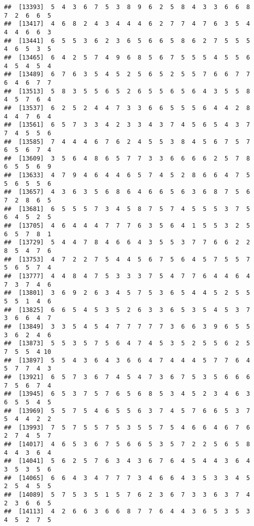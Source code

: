 \documentclass[
]{book}
\begin{document}
\begin{verbatim}
##  [13393]  5  4  3  6  7  5  3  8  9  6  2  5  8  4  3  3  6  6  8  7  2  6  6  5
##  [13417]  4  6  8  2  4  3  4  4  4  6  2  7  7  4  7  6  3  5  4  4  4  6  6  3
##  [13441]  6  5  5  3  6  2  3  6  5  6  6  5  8  6  2  7  5  5  5  4  6  5  3  5
##  [13465]  6  4  2  5  7  4  9  6  8  5  6  7  5  5  5  4  5  5  6  4  5  4  5  4
##  [13489]  6  7  6  3  5  4  5  2  5  6  5  2  5  5  7  6  6  7  7  6  4  6  7  7
##  [13513]  5  8  3  5  5  6  5  2  6  5  5  6  5  6  4  3  5  5  8  4  5  7  6  4
##  [13537]  6  2  5  2  4  4  7  3  3  6  6  5  5  5  6  4  4  2  8  4  4  7  6  4
##  [13561]  6  5  7  3  3  4  2  3  3  4  3  7  4  5  6  5  4  3  7  7  4  5  5  6
##  [13585]  7  4  4  4  6  7  6  2  4  5  5  3  8  4  5  6  7  5  7  6  5  6  7  4
##  [13609]  3  5  6  4  8  6  5  7  7  3  3  6  6  6  6  2  5  7  8  6  5  5  6  9
##  [13633]  4  7  9  4  6  4  4  6  5  7  4  5  2  8  6  6  4  7  5  5  6  5  5  6
##  [13657]  4  3  6  3  5  6  8  6  4  6  6  5  6  3  6  8  7  5  6  7  2  8  6  5
##  [13681]  6  5  5  5  7  3  4  5  8  7  5  7  4  5  5  5  3  7  5  6  4  5  2  5
##  [13705]  4  6  4  4  4  7  7  7  6  3  5  6  4  1  5  5  3  2  5  6  5  7  8  1
##  [13729]  5  4  4  7  8  4  6  6  4  3  5  5  3  7  7  6  6  2  2  8  5  4  7  6
##  [13753]  4  7  2  2  7  5  4  4  5  6  7  5  6  4  5  7  5  5  7  5  6  5  7  4
##  [13777]  4  4  8  4  7  5  3  3  3  7  5  4  7  7  6  4  4  6  4  7  3  7  4  6
##  [13801]  3  6  9  2  6  3  4  5  7  5  3  6  5  4  4  5  2  5  5  5  5  1  4  6
##  [13825]  6  6  5  4  5  3  5  2  6  3  3  6  5  3  5  4  5  3  7  3  6  6  4  7
##  [13849]  3  3  5  4  5  4  7  7  7  7  7  3  6  6  3  9  6  5  5  3  6  2  4  6
##  [13873]  5  5  3  5  7  5  6  4  7  4  5  3  5  2  5  5  6  2  5  7  5  5  4 10
##  [13897]  5  5  4  3  6  4  3  6  6  4  7  4  4  4  5  7  7  6  4  5  7  7  4  3
##  [13921]  6  5  7  3  6  7  4  5  4  7  3  6  7  5  3  5  6  6  6  7  5  6  7  4
##  [13945]  6  5  3  7  5  7  6  5  6  8  5  3  4  5  2  3  4  6  3  6  5  5  4  5
##  [13969]  5  5  7  5  4  6  5  5  6  3  7  4  5  7  6  6  5  3  7  5  4  4  2  2
##  [13993]  7  5  7  5  5  7  5  3  5  5  7  5  4  6  6  4  6  7  6  2  7  4  5  7
##  [14017]  4  6  5  3  6  7  5  6  6  5  3  5  7  2  2  5  6  5  8  4  4  3  6  4
##  [14041]  5  6  2  5  7  6  3  4  3  6  7  6  4  5  4  4  3  6  4  3  5  3  5  6
##  [14065]  6  6  4  3  4  7  7  7  3  4  6  6  4  3  5  3  3  4  5  2  5  4  5  5
##  [14089]  5  7  5  3  5  1  5  7  6  2  3  6  7  3  3  6  3  7  4  2  3  6  6  5
##  [14113]  4  2  6  6  3  6  6  8  7  7  6  4  4  3  6  5  3  5  3  4  5  2  7  5

\end{verbatim}
\end{document}
